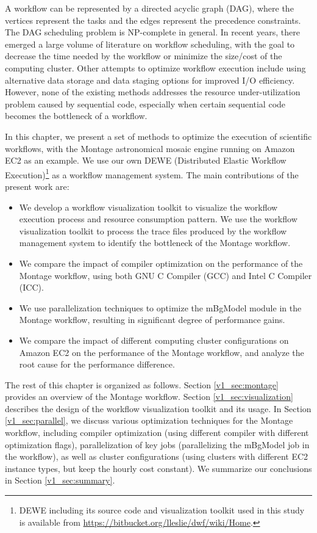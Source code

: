 A workflow can be represented by a directed acyclic graph (DAG), where the vertices represent the tasks and the edges represent the precedence constraints. The DAG scheduling problem is NP-complete in general. In recent years, there emerged a large volume of literature on workflow scheduling, with the goal to decrease the time needed by the workflow or minimize the size/cost of the computing cluster. Other attempts to optimize workflow execution include using alternative data storage and data staging options for improved I/O efficiency. However, none of the existing methods addresses the resource under-utilization problem caused by sequential code, especially when certain sequential code becomes the bottleneck of a workflow. 

In this chapter, we present a set of methods to optimize the execution of scientific workflows, with the Montage astronomical mosaic engine running on Amazon EC2 as an example. We use our own DEWE (Distributed Elastic Workflow Execution)\footnote{DEWE including its source code and visualization toolkit used in this study is available from \url{https://bitbucket.org/lleslie/dwf/wiki/Home}.} as a workflow management system. The main contributions of the present work are:

\begin{itemize}
	\item We develop a workflow visualization toolkit to visualize the workflow execution process and resource consumption pattern. We use the workflow visualization toolkit to process the trace files produced by the workflow management system to identify the bottleneck of the Montage workflow.
	\item We compare the impact of compiler optimization on the performance of the Montage workflow, using both GNU C Compiler (GCC) and Intel C Compiler (ICC).  	
	\item We use parallelization techniques to optimize the mBgModel module in the Montage workflow, resulting in significant degree of performance gains.
	\item We compare the impact of different computing cluster configurations on Amazon EC2 on the performance of the Montage workflow, and analyze the root cause for the performance difference. 
\end{itemize}

The rest of this chapter is organized as follows. Section \ref{v1_sec:montage} provides an overview of the Montage workflow. Section \ref{v1_sec:visualization} describes the design of the workflow visualization toolkit and its usage. In Section \ref{v1_sec:parallel}, we discuss various optimization techniques for the Montage workflow, including compiler optimization (using different compiler with different optimization flags), parallelization of key jobs (parallelizing the mBgModel job in the workflow), as well as cluster configurations (using clusters with different EC2 instance types, but keep the hourly cost constant). We summarize our conclusions in Section \ref{v1_sec:summary}.

